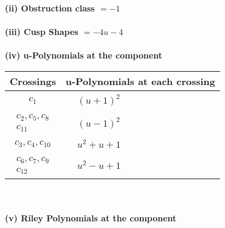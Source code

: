 \documentclass[1p]{elsarticle_modified}
\theoremstyle{definition}
\begin{document}
\flushleft \textbf{(ii) Obstruction class $= -1$}\\~\\
\flushleft \textbf{(iii) Cusp Shapes $= -4 u-4$}\\~\\
\newpage\renewcommand{\arraystretch}{1}
\flushleft \textbf{(iv) u-Polynomials at the component}\newline \\
\begin{tabular}{m{50pt}|m{274pt}}
Crossings & \hspace{64pt}u-Polynomials at each crossing \\
\hline $$\begin{aligned}c_{1}\end{aligned}$$&$\begin{aligned}
&(u+1)^2
\end{aligned}$\\
\hline $$\begin{aligned}c_{2},c_{5},c_{8}\\c_{11}\end{aligned}$$&$\begin{aligned}
&(u-1)^2
\end{aligned}$\\
\hline $$\begin{aligned}c_{3},c_{4},c_{10}\end{aligned}$$&$\begin{aligned}
&u^2+u+1
\end{aligned}$\\
\hline $$\begin{aligned}c_{6},c_{7},c_{9}\\c_{12}\end{aligned}$$&$\begin{aligned}
&u^2- u+1
\end{aligned}$\\
\hline
\end{tabular}\\~\\
\newpage\renewcommand{\arraystretch}{1}
\flushleft \textbf{(v) Riley Polynomials at the component}\newline \\
\end{document}
